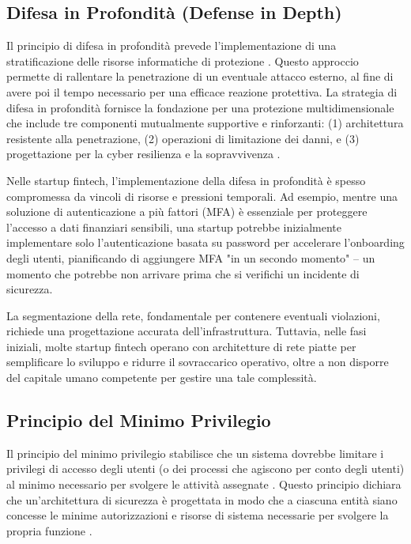 \documentclass[a4paper,12pt]{report}
\begin{document}
\subsection{Difesa in Profondità (Defense in Depth)}
Il principio di difesa in profondità prevede l'implementazione di una stratificazione delle risorse informatiche di protezione \cite{Cyberment}. Questo approccio permette di rallentare la penetrazione di un eventuale attacco esterno, al fine di avere poi il tempo necessario per una efficace reazione protettiva. La strategia di difesa in profondità fornisce la fondazione per una protezione multidimensionale che include tre componenti mutualmente supportive e rinforzanti: (1) architettura resistente alla penetrazione, (2) operazioni di limitazione dei danni, e (3) progettazione per la cyber resilienza e la sopravvivenza \cite{NIST_SP_800_172}.

Nelle startup fintech, l'implementazione della difesa in profondità è spesso compromessa da vincoli di risorse e pressioni temporali. Ad esempio, mentre una soluzione di autenticazione a più fattori (MFA) è essenziale per proteggere l'accesso a dati finanziari sensibili, una startup potrebbe inizialmente implementare solo l'autenticazione basata su password per accelerare l'onboarding degli utenti, pianificando di aggiungere MFA "in un secondo momento" – un momento che potrebbe non arrivare prima che si verifichi un incidente di sicurezza.

La segmentazione della rete, fondamentale per contenere eventuali violazioni, richiede una progettazione accurata dell'infrastruttura. Tuttavia, nelle fasi iniziali, molte startup fintech operano con architetture di rete piatte per semplificare lo sviluppo e ridurre il sovraccarico operativo, oltre a non disporre del capitale umano competente per gestire una tale complessità.

\subsection{Principio del Minimo Privilegio}
Il principio del minimo privilegio stabilisce che un sistema dovrebbe limitare i privilegi di accesso degli utenti (o dei processi che agiscono per conto degli utenti) al minimo necessario per svolgere le attività assegnate \cite{NIST_Glossary}. Questo principio dichiara che un'architettura di sicurezza è progettata in modo che a ciascuna entità siano concesse le minime autorizzazioni e risorse di sistema necessarie per svolgere la propria funzione \cite{NIST_Glossary}.
\end{document}
